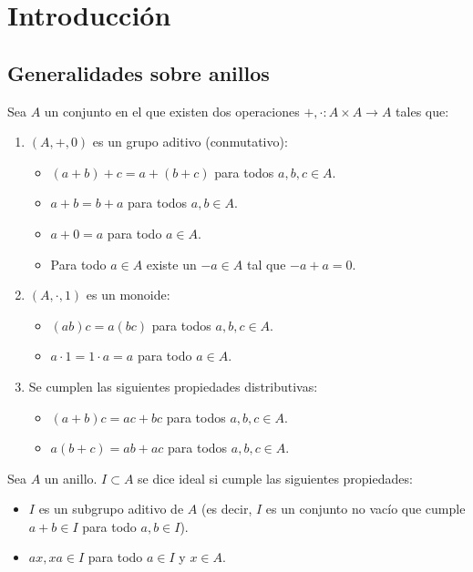 \section{Introducción}
\subsection{Generalidades sobre anillos}
\begin{df}[Anillo]
  Sea \(A\) un conjunto en el que existen dos operaciones
  \(+,\cdot:A\times A\longrightarrow A\) tales que:
  \begin{enumerate}
    \item \((A, +,0)\) es un grupo aditivo (conmutativo):
      \begin{itemize}
        \item \((a+b)+c=a+(b+c)\) para todos \(a,b,c\in A\).
        \item \(a+b=b+a\) para todos \(a,b\in A\).
        \item \(a+0=a\) para todo \(a\in A\).
        \item Para todo \(a\in A\) existe un \(-a\in A\)
          tal que \(-a+a=0\).
      \end{itemize}
    \item \((A, \cdot, 1)\) es un monoide:
      \begin{itemize}
        \item \((ab)c=a(bc)\) para todos \(a,b,c\in A\).
        \item \(a\cdot 1=1\cdot a=a\) para todo \(a\in A\).
      \end{itemize}
    \item Se cumplen las siguientes propiedades distributivas:
      \begin{itemize}
        \item \((a+b)c=ac+bc\) para todos \(a,b,c\in A\).
        \item \(a(b+c)=ab+ac\) para todos \(a,b,c\in A\).
      \end{itemize}
     \end{enumerate}
  \end{df}

  \begin{df}[Ideales]
    Sea \(A\) un anillo. \(I\subset A\) se dice ideal si cumple las
    siguientes propiedades:
    \begin{itemize}
      \item \(I\) es un subgrupo aditivo de \(A\) (es decir,
        \(I\) es un conjunto no vacío que cumple
        \(a + b\in I\) para todo \(a, b\in I\)).
      \item \(ax, xa\in I\) para todo \(a\in I\) y \(x \in A\).
    \end{itemize}
  \end{df}

